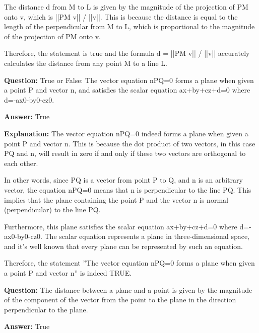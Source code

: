 \documentclass{article}
\begin{document}
The distance d from M to L is given by the magnitude of the projection of PM onto v, which is ||PM {\texttimes} v|| / ||v||. This is because the distance is equal to the length of the perpendicular from M to L, which is proportional to the magnitude of the projection of PM onto v.

Therefore, the statement is true and the formula d = ||PM {\texttimes} v|| / ||v|| accurately calculates the distance from any point M to a line L.
                
                \vspace{0.5cm} 
        
            
                \textbf {Question:} True or False: The vector equation n{\textperiodcentered}PQ=0 forms a plane when given a point P and vector n, and satisfies the scalar equation ax+by+cz+d=0 where d=-ax0-by0-cz0.
                
                \textbf{Answer:} True

                \textbf{Explanation:} The vector equation n{\textperiodcentered}PQ=0 indeed forms a plane when given a point P and vector n. This is because the dot product of two vectors, in this case PQ and n, will result in zero if and only if these two vectors are orthogonal to each other.

In other words, since PQ is a vector from point P to Q, and n is an arbitrary vector, the equation n{\textperiodcentered}PQ=0 means that n is perpendicular to the line PQ. This implies that the plane containing the point P and the vector n is normal (perpendicular) to the line PQ.

Furthermore, this plane satisfies the scalar equation ax+by+cz+d=0 where d=-ax0-by0-cz0. The scalar equation represents a plane in three-dimensional space, and it's well known that every plane can be represented by such an equation.

Therefore, the statement ''The vector equation n{\textperiodcentered}PQ=0 forms a plane when given a point P and vector n'' is indeed TRUE.
                
                \vspace{0.5cm} 
        
            
                \textbf {Question:} The distance between a plane and a point is given by the magnitude of the component of the vector from the point to the plane in the direction perpendicular to the plane.
                
                \textbf{Answer:} True
\end{document}
